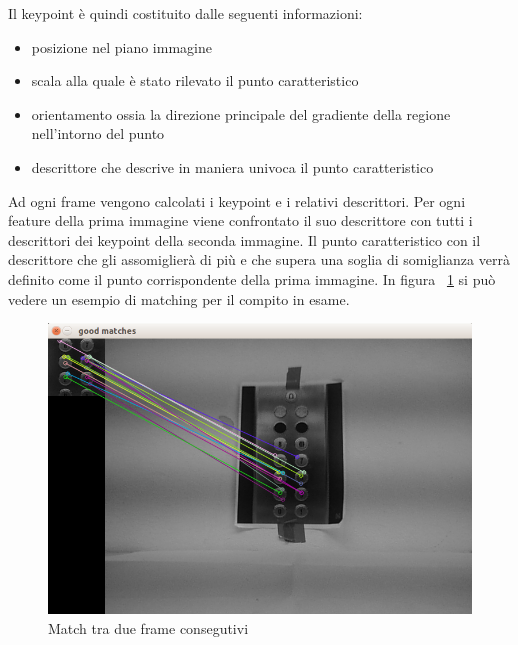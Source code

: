 Il keypoint è quindi costituito dalle seguenti informazioni:
\begin{itemize}
\item posizione nel piano immagine
\item scala alla quale è stato rilevato il punto caratteristico
\item orientamento ossia la direzione principale del gradiente della regione nell'intorno del punto
\item descrittore che descrive in maniera univoca il punto caratteristico
\end{itemize}
Ad ogni frame vengono calcolati i keypoint e i relativi descrittori. Per ogni feature della prima immagine viene confrontato il suo descrittore con tutti i descrittori dei keypoint della seconda immagine. Il punto caratteristico con il descrittore che gli assomiglierà di più e che supera una soglia di somiglianza verrà definito come il punto corrispondente della prima immagine. In figura ~\ref{fig:matching} si può vedere un esempio di matching per il compito in esame.
\begin{figure}[H]
   \centering
   \includegraphics[width=1.\columnwidth]{match1.png}
   \caption{Match tra due frame consegutivi}
   \label{fig:matching} 
\end{figure}